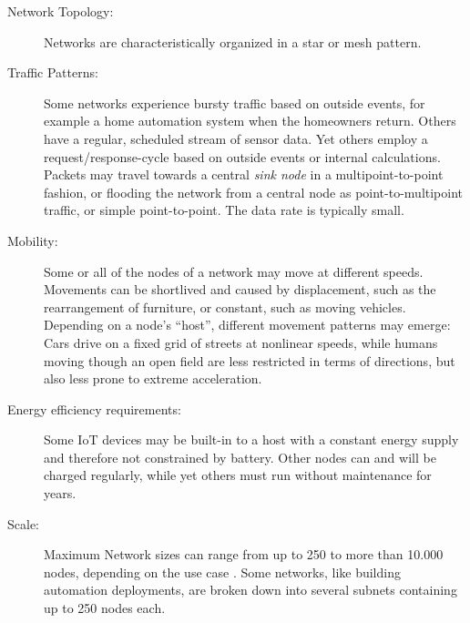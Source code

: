 \documentclass{acm_proc_article-sp}
\begin{document}
\begin{description}
\item[Network Topology:] Networks are characteristically organized in a star or mesh pattern.
\item[Traffic Patterns:] Some networks experience bursty traffic based on outside events, for example a home automation system when the homeowners return. Others have a regular, scheduled stream of sensor data. Yet others employ a request/response-cycle based on outside events or internal calculations. Packets may travel towards a central \emph{sink node} in a multipoint-to-point fashion, or flooding the network from a central node as point-to-multipoint traffic, or simple point-to-point. The data rate is typically small.
\item[Mobility:] Some or all of the nodes of a network may move at different speeds. Movements can be shortlived and caused by displacement, such as the rearrangement of furniture, or constant, such as moving vehicles. Depending on a node's ``host'', different movement patterns may emerge: Cars drive on a fixed grid of streets at nonlinear speeds, while humans moving though an open field are less restricted in terms of directions, but also less prone to extreme acceleration.
\item[Energy efficiency requirements:] Some IoT devices may be built-in to a host with a constant energy supply and therefore not constrained by battery. Other nodes can and will be charged regularly, while yet others must run without maintenance for years.
\item[Scale:] Maximum Network sizes can range from up to 250 to more than 10.000 nodes, depending on the use case \cite{RFC-5826} \cite{RFC-5867} \cite{RFC-5548}. Some networks, like building automation deployments, are broken down into several subnets containing up to 250 nodes each.


\end{description}
\end{document}
